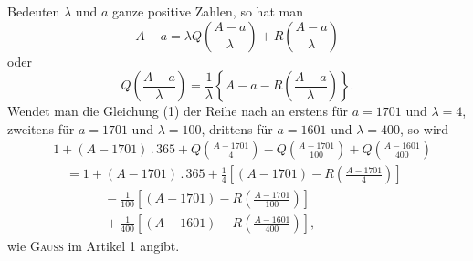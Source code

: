 Bedeuten $\lambda$ und $a$ ganze positive Zahlen, so hat man
\[
A-a=\lambda Q\left(\frac{A-a}{\lambda}\right)+R\left(\frac{A-a}{\lambda}\right)
\]
\noindent oder
\begin{equation}
Q\left(\frac{A-a}{\lambda}\right)=\frac1\lambda\left\{A-a-R\left(\frac{A-a}{\lambda}\right)\right\}.\tag*{(1)}
\end{equation}
\noindent Wendet man die Gleichung (1) der Reihe nach an erstens für $a=1701$ und $\lambda=4$, zweitens für $a=1701$ und $\lambda=100$, drittens für $a=1601$ und $\lambda=400$, so wird
\[
\begin{aligned}
&1+(A-1701)\mathbin{.}365+Q\left(\frac{A-1701}{4}\right)-Q\left(\frac{A-1701}{100}\right)+Q\left(\frac{A-1601}{400}\right)\\
&\quad=1+(A-1701)\mathbin{.}365+\frac14\left[(A-1701)-R\left(\frac{A-1701}{4}\right)\right]\\
&\qquad\qquad-\frac1{100}\left[(A-1701)-R\left(\frac{A-1701}{100}\right)\right]\\
&\qquad\qquad+\frac1{400}\left[(A-1601)-R\left(\frac{A-1601}{400}\right)\right],
\end{aligned}
\]
\noindent wie \textsc{Gauss} im Artikel 1 angibt.

